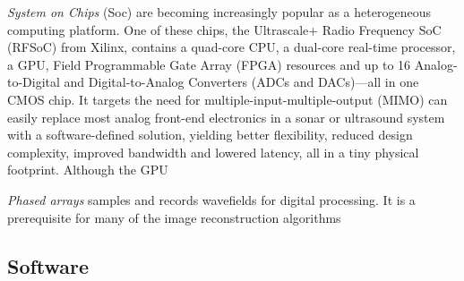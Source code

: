 \emph{System on Chips} (Soc) are becoming increasingly popular as a heterogeneous computing platform. One of these chips, the Ultrascale+ Radio Frequency SoC (RFSoC) from Xilinx, contains a quad-core CPU, a dual-core real-time processor, a GPU, Field Programmable Gate Array (FPGA) resources and up to 16 Analog-to-Digital and Digital-to-Analog Converters (ADCs and DACs)---all in one CMOS chip. It targets the need for multiple-input-multiple-output (MIMO) can easily replace most analog front-end electronics in a sonar or ultrasound system with a software-defined solution, yielding better flexibility, reduced design complexity, improved bandwidth and lowered latency, all in a tiny physical footprint. Although the GPU

\emph{Phased arrays} samples and records wavefields for digital processing. It is a prerequisite for many of the image reconstruction algorithms



\subsection{Software}


